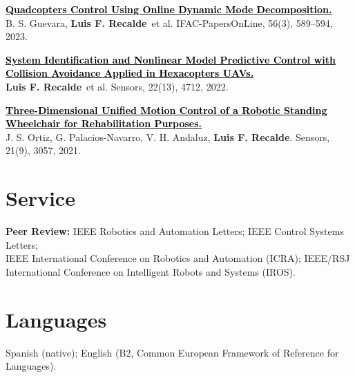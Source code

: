 \documentclass[letterpaper,11pt]{article}
\newcommand{\authorname}{\textcolor{AuthorTeal}{\textbf{Luis F. Recalde}}}
\newcommand{\journal}[1]{\textcolor{JournalPlum}{#1}}
\newcommand{\papertitle}[1]{\textcolor{black}{\textbf{#1}}}
\begin{document}
\begin{enumerate}[leftmargin=0.28in, label={[\arabic*]}, itemsep=2pt, parsep=0pt, topsep=3pt]
\item \href{https://doi.org/10.1016/j.ifacol.2023.12.088}{\papertitle{Quadcopters Control Using Online Dynamic Mode Decomposition.}}\\
B. S. Guevara, \authorname\ et al. \journal{IFAC-PapersOnLine}, 56(3), 589--594, 2023.
\item \href{https://doi.org/10.3390/s22134712}{\papertitle{System Identification and Nonlinear Model Predictive Control with Collision Avoidance Applied in Hexacopters UAVs.}}\\
\authorname\ et al. \journal{Sensors}, 22(13), 4712, 2022.
\item \href{https://doi.org/10.3390/s21093057}{\papertitle{Three-Dimensional Unified Motion Control of a Robotic Standing Wheelchair for Rehabilitation Purposes.}}\\
J. S. Ortiz, G. Palacios-Navarro, V. H. Andaluz, \authorname. \journal{Sensors}, 21(9), 3057, 2021.
\end{enumerate}
\section{Service}
{\small
\textbf{Peer Review:} IEEE Robotics and Automation Letters; IEEE Control Systems Letters;\\
IEEE International Conference on Robotics and Automation (ICRA); IEEE/RSJ International Conference on Intelligent Robots and Systems (IROS).\par}
\section{Languages}
{\small Spanish (native); English (B2, Common European Framework of Reference for Languages).\par}
\end{document}
